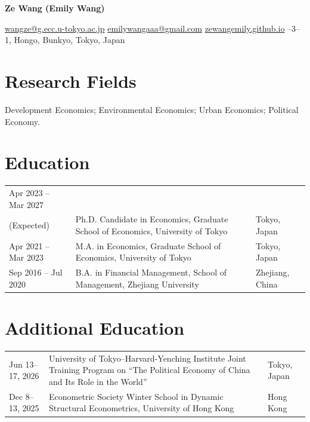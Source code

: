 \documentclass[10pt,a4paper]{article}
\newcommand{\cvname}[1]{\begin{center}{\LARGE\bfseries #1}\end{center}}
\begin{document}
\cvname{Ze Wang (Emily Wang)}
\begin{center}\small
  \href{mailto:wangze@g.ecc.u-tokyo.ac.jp}{wangze@g.ecc.u-tokyo.ac.jp}
  \;\textbar\;
  \href{mailto:emilywangaaa@gmail.com}{emilywangaaa@gmail.com}
  \;\textbar\;
  \href{https://zewangemily.github.io/}{zewangemily.github.io}
  \;\textbar{}--3--1, Hongo, Bunkyo, Tokyo, Japan
\end{center}

\section*{Research Fields}
Development Economics; Environmental Economics; Urban Economics; Political Economy.

\section*{Education}
\begin{tabularx}{\textwidth}{@{}p{}X>{\raggedleft\arraybackslash}p{}@{}}
Apr 2023 -- Mar 2027\\(Expected) & Ph.D. Candidate in Economics, Graduate School of Economics, University of Tokyo & Tokyo, Japan \\
Apr 2021 -- Mar 2023 & M.A. in Economics, Graduate School of Economics, University of Tokyo & Tokyo, Japan \\
Sep 2016 -- Jul 2020 & B.A. in Financial Management, School of Management, Zhejiang University & Zhejiang, China \\
\end{tabularx}

\section*{Additional Education}
\begin{tabularx}{\textwidth}{@{}p{}X>{\raggedleft\arraybackslash}p{}@{}}
Jun 13--17, 2026 & University of Tokyo--Harvard-Yenching Institute Joint Training Program on ``The Political Economy of China and Its Role in the World'' & Tokyo, Japan \\
Dec 8--13, 2025 & Econometric Society Winter School in Dynamic Structural Econometrics, University of Hong Kong & Hong Kong \\
\end{tabularx}
\end{document}
